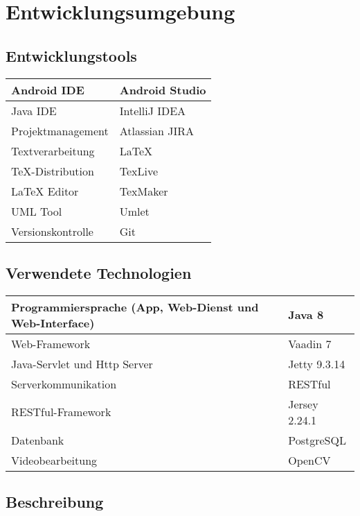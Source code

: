 \chapter{Entwicklungsumgebung}

\section{Entwicklungstools}

\begin{flushleft}
\begin{tabularx} {\textwidth}{|X|X|} \hline
\gls{Android} IDE & \gls{Android} Studio \\ \hline
Java IDE & IntelliJ IDEA \\ \hline
Projektmanagement & Atlassian JIRA \\ \hline
Textverarbeitung & LaTeX \\ \hline
TeX-Distribution & TexLive \\ \hline
LaTeX Editor & TexMaker \\ \hline
UML Tool & Umlet \\ \hline
Versionskontrolle & Git \\ \hline
\end{tabularx}
\end{flushleft}

\section{Verwendete Technologien}

\begin{flushleft}
\begin{tabularx} {\textwidth}{|X|X|} \hline
Programmiersprache (\gls{App}, \gls{Web-Dienst} und \gls{Web-Interface}) & Java 8 \\ \hline
Web-Framework & Vaadin 7 \\ \hline
\gls{Java-Servlet} und Http Server & Jetty 9.3.14 \\ \hline
Serverkommunikation & RESTful \\ \hline
RESTful-Framework & Jersey 2.24.1 \\ \hline
Datenbank & PostgreSQL \\ \hline
Videobearbeitung & OpenCV \\ \hline
\end{tabularx}
\end{flushleft}

\section{Beschreibung}

